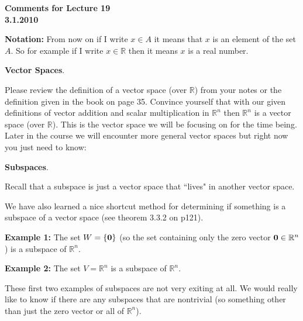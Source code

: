 \documentclass[12pt]{article}
\begin{document}
\begin{center}
{\large \bf Comments for Lecture 19}\\
\bf{3.1.2010}
\end{center}



{\bf Notation:} From now on if I write $x\in A$ it means that $x$ is an element of the set $A$.  So for example if I write $x\in \mathbb{R}$ then it means $x$ is a real number.\\

\begin{center}{\LARGE \bf Vector Spaces}.\end{center}

Please review the definition of a vector space (over $\mathbb{R}$) from your notes or the definition given in the book on page 35.  Convince yourself that with our given definitions of vector addition and scalar multiplication in $\mathbb{R}^n$ then  $\mathbb{R}^n$ is a vector space (over $\mathbb{R}$).  This is the vector space we will be focusing on for the time being.  Later in the course we will encounter more general vector spaces but right now you just need to know:

\begin{center} 
\end{center}


\begin{center}{\LARGE \bf Subspaces}.\end{center}

Recall that a subspace is just a vector space that ``lives" in another vector space.

We have also learned a nice shortcut method for determining if something is a subspace of a vector space (see theorem 3.3.2 on p121).

{\bf Example 1:}  The set $W=\{{\bf 0} \}$ (so the set containing only the zero vector ${\bf 0}\in \mathbb{R}^n$) is a subspace of $\mathbb{R}^n$.

{\bf Example 2:}  The set $V=\mathbb{R}^n$ is a subspace of $\mathbb{R}^n$. 

These first two examples of subspaces are not very exiting at all.  We would really like to know if there are any subspaces that are nontrivial (so something other than just the zero vector or all of $\mathbb{R}^n$).
\end{document}
